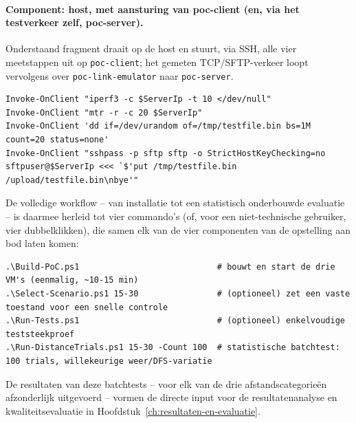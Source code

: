 \paragraph{Component: host, met aansturing van poc-client (en, via het testverkeer zelf,
poc-server).} Onderstaand fragment draait op de host en stuurt, via SSH, alle vier
meetstappen uit op \texttt{poc-client}; het gemeten TCP/SFTP-verkeer loopt vervolgens
over \texttt{poc-link-emulator} naar \texttt{poc-server}.



\begin{listing}[h]
\begin{lstlisting}[style=powershellstyle]
Invoke-OnClient "iperf3 -c $ServerIp -t 10 </dev/null"
Invoke-OnClient "mtr -r -c 20 $ServerIp"
Invoke-OnClient 'dd if=/dev/urandom of=/tmp/testfile.bin bs=1M count=20 status=none'
Invoke-OnClient "sshpass -p sftp sftp -o StrictHostKeyChecking=no sftpuser@$ServerIp <<< `$'put /tmp/testfile.bin /upload/testfile.bin\nbye'"
\end{lstlisting}
\caption[Run-Tests.ps1]{Kern van \texttt{Run-Tests.ps1}: de vier meetstappen voor één
enkelvoudige teststeekproef, aangeroepen vanaf de host en uitgevoerd op:
\texttt{poc-client}, waarbij het testverkeer zelf via \texttt{poc-link-emulator} naar
\texttt{poc-server} loopt.}
\label{lst:workflow-volledig}
\end{listing}

De volledige workflow -- van installatie tot een statistisch onderbouwde evaluatie -- is
daarmee herleid tot vier commando's (of, voor een niet-technische gebruiker, vier
dubbelklikken), die samen elk van de vier componenten van de opstelling aan bod laten
komen:


\begin{listing}[h]
\begin{lstlisting}[style=powershellstyle]
.\Build-PoC.ps1                            # bouwt en start de drie VM's (eenmalig, ~10-15 min)
.\Select-Scenario.ps1 15-30                # (optioneel) zet een vaste toestand voor een snelle controle
.\Run-Tests.ps1                            # (optioneel) enkelvoudige teststeekproef
.\Run-DistanceTrials.ps1 15-30 -Count 100  # statistische batchtest: 100 trials, willekeurige weer/DFS-variatie
\end{lstlisting}
\caption[Volledige workflow]{De volledige workflow van installatie tot statistisch
onderbouwde evaluatie: alle vier commando's worden vanaf de host uitgevoerd, en sturen
achtereenvolgens alle drie VM's (bij de opbouw), \texttt{poc-link-emulator} (scenario),
\texttt{poc-client} (teststeekproef), en \texttt{poc-link-emulator}~+~\texttt{poc-client}
(batchtest) aan.}
\label{lst:workflow-kort}
\end{listing}

De resultaten van deze batchtests -- voor elk van de drie afstandscategorieën
afzonderlijk uitgevoerd -- vormen de directe input voor de resultatenanalyse en
kwaliteitsevaluatie in Hoofdstuk~\ref{ch:resultaten-en-evaluatie}.